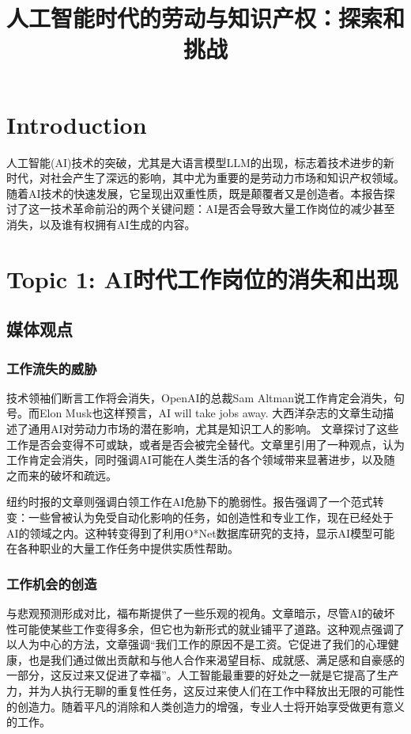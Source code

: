 \documentclass[11pt]{article}
\title{人工智能时代的劳动与知识产权：探索和挑战}
\begin{document}
\maketitle

\section{Introduction}

人工智能(AI)技术的突破，尤其是大语言模型LLM的出现，标志着技术进步的新时代，对社会产生了深远的影响，其中尤为重要的是劳动力市场和知识产权领域。随着AI技术的快速发展，它呈现出双重性质，既是颠覆者又是创造者。本报告探讨了这一技术革命前沿的两个关键问题：AI是否会导致大量工作岗位的减少甚至消失，以及谁有权拥有AI生成的内容。

\section{Topic 1: AI时代工作岗位的消失和出现}

\subsection{媒体观点}
\subsubsection{工作流失的威胁}

技术领袖们断言工作将会消失，OpenAI的总裁Sam Altman说工作肯定会消失，句号。而Elon Musk也这样预言，AI will take jobs away.
大西洋杂志的文章生动描述了通用AI对劳动力市场的潜在影响，尤其是知识工人的影响。
文章探讨了这些工作是否会变得不可或缺，或者是否会被完全替代。文章里引用了一种观点，认为工作肯定会消失，同时强调AI可能在人类生活的各个领域带来显著进步，以及随之而来的破坏和疏远。

纽约时报的文章则强调白领工作在AI危胁下的脆弱性。报告强调了一个范式转变：一些曾被认为免受自动化影响的任务，如创造性和专业工作，现在已经处于AI的领域之内。这种转变得到了利用O*Net数据库研究的支持，显示AI模型可能在各种职业的大量工作任务中提供实质性帮助。

\subsubsection{工作机会的创造}

与悲观预测形成对比，福布斯提供了一些乐观的视角。文章暗示，尽管AI的破坏性可能使某些工作变得多余，但它也为新形式的就业铺平了道路。这种观点强调了以人为中心的方法，文章强调“我们工作的原因不是工资。它促进了我们的心理健康，也是我们通过做出贡献和与他人合作来渴望目标、成就感、满足感和自豪感的一部分，这反过来又促进了幸福”。人工智能最重要的好处之一就是它提高了生产力，并为人执行无聊的重复性任务，这反过来使人们在工作中释放出无限的可能性的创造力。随着平凡的消除和人类创造力的增强，专业人士将开始享受做更有意义的工作。
\end{document}
